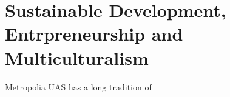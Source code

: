 \section{Sustainable Development, Entrpreneurship and Multiculturalism}

Metropolia UAS has a long tradition of 